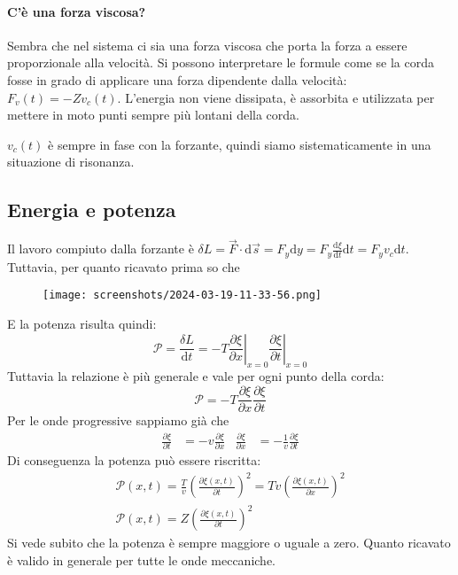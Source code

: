 \paragraph{C'è una forza viscosa?}

Sembra che nel sistema ci sia una forza viscosa che porta la forza a essere proporzionale alla velocità. Si possono interpretare le formule come se la corda fosse in grado di applicare una forza dipendente dalla velocità: \(F_v(t) = -Z v_c(t)\). L'energia non viene dissipata, è assorbita e utilizzata per mettere in moto punti sempre più lontani della corda.

\begin{note}
	\(v_c(t)\) è sempre in fase con la forzante, quindi siamo sistematicamente in una situazione di risonanza.
\end{note}

\subsection{Energia e potenza}

Il lavoro compiuto dalla forzante è \(\delta L = \vec{F} \cdot \mathrm{d} \vec{s} = F_y \mathrm{d} y = F_y \frac{\mathrm{d}\xi }{\mathrm{d}t} \mathrm{d} t = F_y v_c \mathrm{d} t \). Tuttavia, per quanto ricavato prima so che

\begin{figure}[H]
	\centering
	\texttt{[image: screenshots/2024-03-19-11-33-56.png]}
\end{figure}

E la potenza risulta quindi:
\[
	\mathcal{P} = \frac{\delta L}{\mathrm{d} t} = -T \left. \frac{\partial \xi }{\partial x} \right\vert_{x=0} \left. \frac{\partial \xi}{\partial t}\right\vert_{x=0} 
\]
Tuttavia la relazione è più generale e vale per ogni punto della corda:
\[
	\mathcal{P} = -T \frac{\partial \xi }{\partial x} \frac{\partial \xi }{\partial t}
\]
Per le onde progressive sappiamo già che 
\begin{align}\label{eq:derivatives_prog_wave}
	\frac{\partial \xi }{\partial t} &= -v \frac{\partial \xi }{\partial x} & \frac{\partial \xi }{\partial x} &=-\frac{1}{v}\frac{\partial \xi }{\partial t}    
\end{align}
Di conseguenza la potenza può essere riscritta:
\begin{gather*}
	\mathcal{P} (x,t) = \frac{T}{v}\left(\frac{\partial \xi (x,t)}{\partial t}\right)^{2}  = Tv\left(\frac{\partial \xi (x,t)}{\partial x} \right)^{2} \\
	\mathcal{P} (x,t) = Z \left(\frac{\partial \xi (x,t)}{\partial t}\right)^{2}
\end{gather*}
Si vede subito che la potenza è sempre maggiore o uguale a zero. Quanto ricavato è valido in generale per tutte le onde meccaniche.

